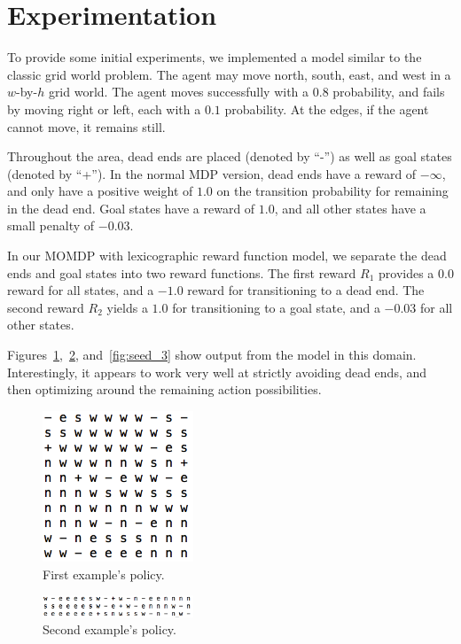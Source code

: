 \section{Experimentation}
\label{sec:experimentation}

To provide some initial experiments, we implemented a model similar to the classic grid world problem. The agent may move north, south, east, and west in a $w$-by-$h$ grid world. The agent moves successfully with a $0.8$ probability, and fails by moving right or left, each with a $0.1$ probability. At the edges, if the agent cannot move, it remains still.

Throughout the area, dead ends are placed (denoted by ``-'') as well as goal states (denoted by ``+''). In the normal MDP version, dead ends have a reward of $-\infty$, and only have a positive weight of $1.0$ on the transition probability for remaining in the dead end. Goal states have a reward of $1.0$, and all other states have a small penalty of $-0.03$.

In our MOMDP with lexicographic reward function model, we separate the dead ends and goal states into two reward functions. The first reward $R_1$ provides a $0.0$ reward for all states, and a $-1.0$ reward for transitioning to a dead end. The second reward $R_2$ yields a $1.0$ for transitioning to a goal state, and a $-0.03$ for all other states.

Figures~\ref{fig:seed_1},~\ref{fig:seed_2}, and~\ref{fig:seed_3} show output from the model in this domain. Interestingly, it appears to work very well at strictly avoiding dead ends, and then optimizing around the remaining action possibilities.
\begin{figure}[h]
    \centering
    \includegraphics[width=0.4\textwidth,bb=0 0 279 280]{seed_1.png}
    \caption{First example's policy.}
    \label{fig:seed_1}
\end{figure}

\begin{figure}[h]
    \centering
    \includegraphics[width=0.4\textwidth,bb=0 0 561 81]{seed_2.png}
    \caption{Second example's policy.}
    \label{fig:seed_2}
\end{figure}

